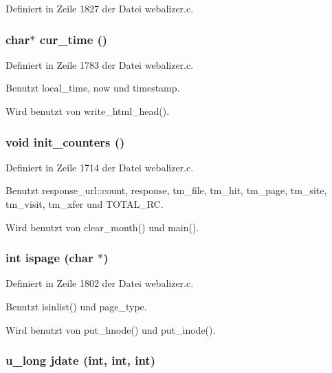 Definiert in Zeile 1827 der Datei webalizer.c.
\subsubsection{\setlength{\rightskip}{0pt plus 5cm}char$\ast$ cur\_\-time ()}\label{webalizer_8h_f6fc05ecb3c962ea69fac0a9ce9525d7}




Definiert in Zeile 1783 der Datei webalizer.c.

Benutzt local\_\-time, now und timestamp.

Wird benutzt von write\_\-html\_\-head().
\subsubsection{\setlength{\rightskip}{0pt plus 5cm}void init\_\-counters ()}\label{webalizer_8h_c13990c5857877d516d60af22bfbc492}




Definiert in Zeile 1714 der Datei webalizer.c.

Benutzt response\_\-url::count, response, tm\_\-file, tm\_\-hit, tm\_\-page, tm\_\-site, tm\_\-visit, tm\_\-xfer und TOTAL\_\-RC.

Wird benutzt von clear\_\-month() und main().
\subsubsection{\setlength{\rightskip}{0pt plus 5cm}int ispage (char $\ast$)}\label{webalizer_8h_cd1966893702ec0520fb7a743275a2e0}




Definiert in Zeile 1802 der Datei webalizer.c.

Benutzt isinlist() und page\_\-type.

Wird benutzt von put\_\-hnode() und put\_\-inode().
\subsubsection{\setlength{\rightskip}{0pt plus 5cm}u\_\-long jdate (int, int, int)}\label{webalizer_8h_dd01ad5cfed4640cdbb33666ea88a572}




